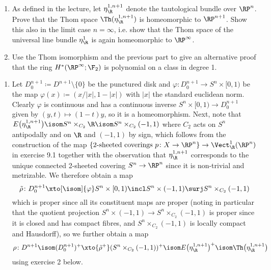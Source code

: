 \begin{exercise}
	\leavevmode
	\begin{enumerate}
		\item As defined in the lecture, let $\eta_\R^{1, n + 1}$ denote the tautological bundle over $\RP^n$.
			Prove that the Thom space $\Th(\eta_\R^{1, n + 1})$ is homeomorphic to $\RP^{n + 1}$.
			Show this also in the limit case $n = \infty$, i.e. show that the Thom space of the universal line bundle $\eta_\R^1$ is again homeomorphic to $\RP^\infty$.
		\item Use the Thom isomorphism and the previous part to give an alternative proof that the ring $H^*(\RP^\infty; \F_2)$ is polynomial on a class in degree 1.
	\end{enumerate}
\end{exercise}
\begin{solution}
	\leavevmode
	\begin{enumerate}
		\item Let $D^{n + 1}_0 \coloneq D^{n + 1} \setminus \{0\}$ be the punctured disk and $\varphi\colon D^{n + 1}_0 \to S^n \times [0, 1)$ be the map $\varphi(x) \coloneq (x / |x|, 1 - |x|)$ with $|x|$ the standard euclidean norm.
			Clearly $\varphi$ is continuous and has a continuous inverse $S^n \times [0, 1) \to D^{n + 1}_0$ given by $(y, t) \mapsto (1 - t) y$, so it is a homeomorphism.
			Next, note that $E\big(\eta_\R^{1, n + 1}\big) \isom S^n \times_{C_2} \R \isom S^n \times_{C_2} (-1, 1)$ where $C_2$ acts on $S^n$ antipodally and on $\R$ and $(-1, 1)$ by sign, which follows from the construction of the map $\{\text{2-sheeted coverings } p\colon X \to \RP^n\} \to \Vect_\R^1(\RP^n)$ in exercise 9.1 together with the observation that $\eta_\R^{1, n + 1}$ corresponds to the unique connected 2-sheeted covering $S^n \to \RP^n$ since it is non-trivial and metrizable.
			We therefore obtain a map 
			\begin{equation*}
				\tilde{\rho}\colon D^{n + 1}_0 \xto[\isom]{\varphi} S^n \times [0, 1) \incl S^n \times (-1, 1) \surj S^n \times_{C_2} (-1, 1)
			\end{equation*}
			which is proper since all its constituent maps are proper (noting in particular that the quotient projection $S^n \times (-1, 1) \to S^n \times_{C_2} (-1, 1)$ is proper since it is closed and has compact fibres, and $S^n \times_{C_2} (-1, 1)$ is locally compact and Hausdorff), so we further obtain a map 
			\begin{equation*}
				\rho\colon D^{n + 1} \isom (D^{n + 1}_0)^+ \xto{\tilde{\rho}^+} (S^n \times_{C_2} (-1, 1))^+ \isom E\big(\eta_\R^{1, n + 1}\big)^+ \isom \Th\big(\eta_\R^{1, n + 1}\big)
			\end{equation*}
			using exercise 2 below.


\end{enumerate}
\end{solution}
